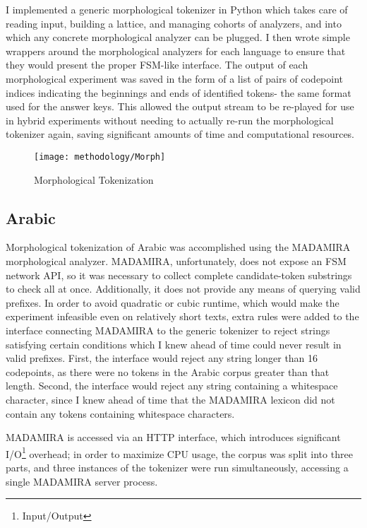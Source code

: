 I implemented a generic morphological tokenizer in Python which takes care of reading input, building a lattice, and managing cohorts of analyzers, and into which any concrete morphological analyzer can be plugged. I then wrote simple wrappers around the morphological analyzers for each language to ensure that they would present the proper FSM-like interface.
The output of each morphological experiment was saved in the form of a list of pairs of codepoint indices indicating the beginnings and ends of identified tokens- the same format used for the answer keys. This allowed the output stream to be re-played for use in hybrid experiments without needing to actually re-run the morphological tokenizer again, saving significant amounts of time and computational resources.

\begin{figure}[h!]
	\texttt{[image: methodology/Morph]}
	\caption{Morphological Tokenization}
	\label{morphdiagram}
\end{figure}

\subsection{Arabic}
Morphological tokenization of Arabic was accomplished using the MADAMIRA morphological analyzer\cite{pasha2014}. MADAMIRA, unfortunately, does not expose an FSM network API, so it was necessary to collect complete candidate-token substrings to check all at once. Additionally, it does not provide any means of querying valid prefixes. In order to avoid quadratic or cubic runtime, which would make the experiment infeasible even on relatively short texts, extra rules were added to the interface connecting MADAMIRA to the generic tokenizer to reject strings satisfying certain conditions which I knew ahead of time could never result in valid prefixes. First, the interface would reject any string longer than 16 codepoints, as there were no tokens in the Arabic corpus greater than that length. Second, the interface would reject any string containing a whitespace character, since I knew ahead of time that the MADAMIRA lexicon did not contain any tokens containing whitespace characters.

MADAMIRA is accessed via an HTTP interface, which introduces significant I/O\footnote{Input/Output} overhead; in order to maximize CPU usage, the corpus was split into three parts, and three instances of the tokenizer were run simultaneously, accessing a single MADAMIRA server process.

